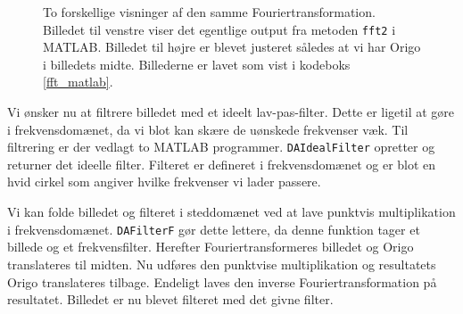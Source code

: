 \documentclass[a4paper, 10pt, danish, final]{article}
\begin{document}
\begin{figure}[!h]
    \centering
    \caption[]{To forskellige visninger af den samme
    Fouriertransformation. Billedet til venstre viser det egentlige
    output fra metoden \texttt{fft2} i MATLAB. Billedet til højre er
    blevet justeret således at vi har Origo i billedets midte.
    Billederne er lavet som vist i kodeboks \ref{fft_matlab}.}
    \label{ffts}
\end{figure}

Vi ønsker nu at filtrere billedet med et ideelt lav-pas-filter. Dette er
ligetil at gøre i frekvensdomænet, da vi blot kan skære de uønskede
frekvenser væk. Til filtrering er der vedlagt to MATLAB programmer.
\texttt{DAIdealFilter} opretter og returner det ideelle filter. Filteret
er defineret i frekvensdomænet og er blot en hvid cirkel som angiver
hvilke frekvenser vi lader passere.

Vi kan folde billedet og filteret i steddomænet ved at lave punktvis
multiplikation i frekvensdomænet. \texttt{DAFilterF} gør dette lettere,
da denne funktion tager et billede og et frekvensfilter. Herefter
Fouriertransformeres billedet og Origo translateres til midten. Nu
udføres den punktvise multiplikation og resultatets Origo translateres
tilbage. Endeligt laves den inverse Fouriertransformation på resultatet.
Billedet er nu blevet filteret med det givne filter.
\end{document}
